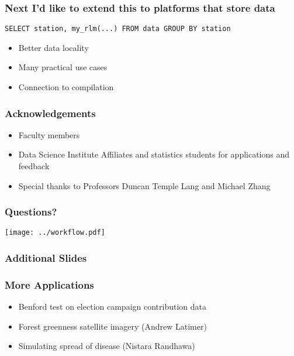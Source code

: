 \documentclass{beamer}
\begin{document}
\begin{frame}[fragile]

\frametitle{Next I'd like to extend this to platforms that store data}


\begin{verbatim}
SELECT station, my_rlm(...) FROM data GROUP BY station
\end{verbatim}

\begin{itemize}
    \item Better data locality
    \item Many practical use cases
    \item Connection to compilation
\end{itemize}

\end{frame}
\begin{frame}

    \frametitle{Acknowledgements}

\begin{itemize}
    \item Faculty members
    \item Data Science Institute Affiliates and statistics students for
        applications and feedback
    \item Special thanks to Professors Duncan Temple Lang and Michael Zhang
\end{itemize}

\end{frame}
\begin{frame}

    \frametitle{Questions?}
    \centerline{\texttt{[image: ../workflow.pdf]}}

\end{frame}
\begin{frame}

    \frametitle{Additional Slides}

\end{frame}
\begin{frame}

    \frametitle{More Applications}


\begin{itemize}
    \item Benford test on election campaign contribution data
    \item Forest greenness satellite imagery (Andrew Latimer)
    \item Simulating spread of disease (Nistara Randhawa)
\end{itemize}

\end{frame}
\end{document}

